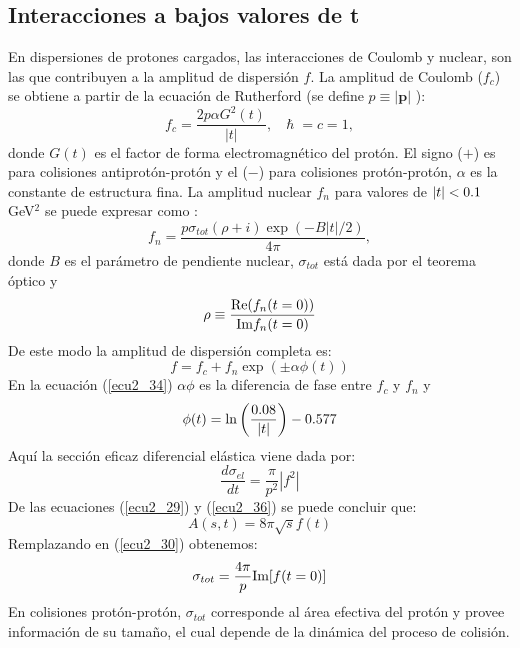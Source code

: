 \subsection*{Interacciones a bajos valores de  t}
En dispersiones de protones cargados, las interacciones de Coulomb y nuclear, son las que contribuyen a la amplitud de dispersi\'on $f$. 
La amplitud de Coulomb ($f_c$) se obtiene a partir de la ecuaci\'on de Rutherford (se define $p\equiv|\pmb{p}|$ ): 
\begin{equation}
f_c=\frac{2p\alpha G^2(t)}{|t|},\ \ \  \hslash=c=1,
\end{equation}
donde $G(t)$ es el factor de forma electromagn\'etico del prot\'on. El signo ($+$) es para colisiones antiprot\'on-prot\'on y el ($-$) para colisiones prot\'on-prot\'on, $\alpha$ es la constante de estructura fina. La amplitud  nuclear $f_n$ para valores de $|t|<0\textup{.}1$ GeV$^2$ se puede expresar como  \cite{carlosavila}:
\begin{equation}
f_n=\frac{p\sigma_{tot}(\rho+i)\exp(-B|t|/2)}{4\pi},
\end{equation}
donde $B$ es el par\'ametro de pendiente nuclear, $\sigma_{tot}$ est\'a dada por el teorema \'optico y \begin{equation}\label{ecu2_33}
\rho \equiv \frac{\textup{Re}(f_n(t=0))}{\textup{Im}f_n(t=0)}
\end{equation}
De este modo la amplitud de dispersi\'on completa  es:
\begin{equation}\label{ecu2_34}
f=f_c+f_n \exp(\pm\alpha\phi(t))
\end{equation}
En la ecuaci\'on (\ref{ecu2_34}) $\alpha\phi$ es la diferencia de fase entre $f_c$ y $f_n$ y \begin{equation}
\phi(t)=\ln\left(\frac{0\textup{.}08}{|t|}\right)-0\textup{.}577
\end{equation}
Aqu\'i la secci\'on eficaz diferencial el\'astica viene dada por:
\begin{equation}\label{ecu2_36}
\frac{d\sigma_{el}}{dt}=\frac{\pi}{p^2}|f^2|
\end{equation}
De las ecuaciones (\ref{ecu2_29}) y (\ref{ecu2_36})
se puede concluir que:
\begin{equation*}
A(s,t)=8\pi\sqrt{s}f(t)
\end{equation*}
Remplazando en (\ref{ecu2_30}) obtenemos:
\begin{equation}
\sigma_{tot}=\frac{4\pi}{p}\textup{Im}[f(t=0)]
\end{equation}
En colisiones prot\'on-prot\'on, $\sigma_{tot}$  corresponde al \'area efectiva del prot\'on y provee informaci\'on de su tama\~no, el cual depende de la din\'amica del proceso de colisi\'on.\newpage

